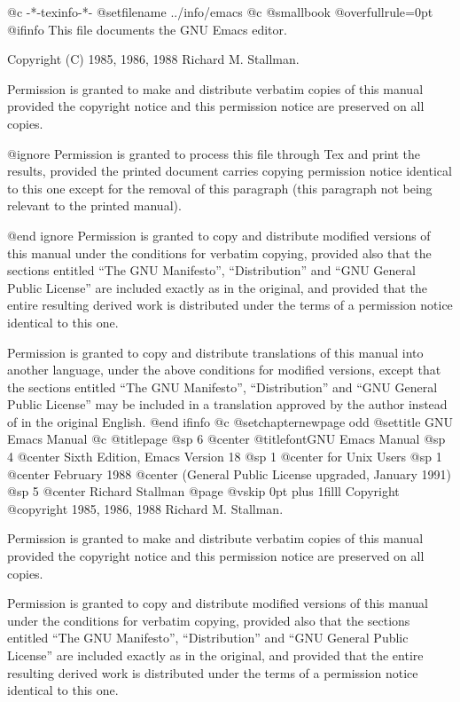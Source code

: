   @c -*-texinfo-*-
@setfilename ../info/emacs
@c @smallbook
@overfullrule=0pt
@ifinfo
This file documents the GNU Emacs editor.

Copyright (C) 1985, 1986, 1988 Richard M. Stallman.

Permission is granted to make and distribute verbatim copies of
this manual provided the copyright notice and this permission notice
are preserved on all copies.

@ignore
Permission is granted to process this file through Tex and print the
results, provided the printed document carries copying permission
notice identical to this one except for the removal of this paragraph
(this paragraph not being relevant to the printed manual).

@end ignore
Permission is granted to copy and distribute modified versions of this
manual under the conditions for verbatim copying, provided also that the
sections entitled ``The GNU Manifesto'', ``Distribution'' and ``GNU
General Public License'' are included exactly as in the original, and
provided that the entire resulting derived work is distributed under the
terms of a permission notice identical to this one.

Permission is granted to copy and distribute translations of this manual
into another language, under the above conditions for modified versions,
except that the sections entitled ``The GNU Manifesto'',
``Distribution'' and ``GNU General Public License'' may be included in a
translation approved by the author instead of in the original English.
@end ifinfo
@c
@setchapternewpage odd
@settitle GNU Emacs Manual
@c
@titlepage
@sp 6
@center @titlefont{GNU Emacs Manual}
@sp 4
@center Sixth Edition, Emacs Version 18
@sp 1
@center for Unix Users
@sp 1
@center February 1988
@center (General Public License upgraded, January 1991)
@sp 5
@center Richard Stallman
@page
@vskip 0pt plus 1filll
Copyright @copyright{} 1985, 1986, 1988 Richard M. Stallman.

Permission is granted to make and distribute verbatim copies of
this manual provided the copyright notice and this permission notice
are preserved on all copies.

Permission is granted to copy and distribute modified versions of this
manual under the conditions for verbatim copying, provided also that the
sections entitled ``The GNU Manifesto'', ``Distribution'' and ``GNU
General Public License'' are included exactly as in the original, and
provided that the entire resulting derived work is distributed under the
terms of a permission notice identical to this one.

